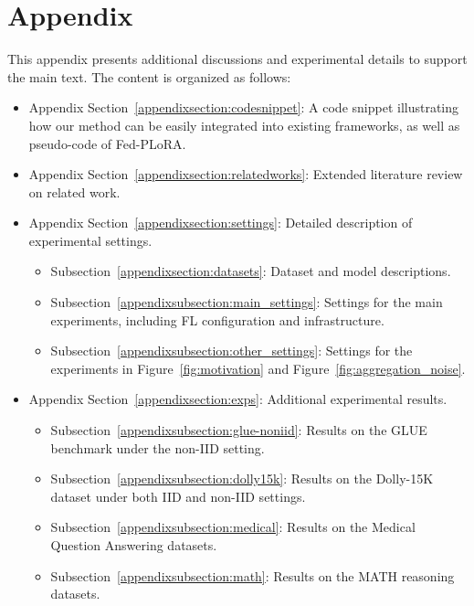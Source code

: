\documentclass{article} %
\begin{document}
\newpage

\section*{Appendix}

This appendix presents additional discussions and experimental details to support the main text. The content is organized as follows:

\begin{itemize}
    \item Appendix Section~\ref{appendixsection:codesnippet}: A code snippet illustrating how our method can be easily integrated into existing frameworks{, as well as pseudo-code of Fed-PLoRA.
    }


    \item Appendix Section~\ref{appendixsection:relatedworks}: Extended literature review on related work.

    \item Appendix Section~\ref{appendixsection:settings}: Detailed description of experimental settings.
        \begin{itemize}
            \item Subsection~\ref{appendixsection:datasets}: Dataset and model descriptions.
            \item Subsection~\ref{appendixsubsection:main_settings}: Settings for the main experiments, including FL configuration and infrastructure.
            \item Subsection~\ref{appendixsubsection:other_settings}: Settings for the experiments in Figure~\ref{fig:motivation} and Figure~\ref{fig:aggregation_noise}.
        \end{itemize}

    \item Appendix Section~\ref{appendixsection:exps}: Additional experimental results.
        \begin{itemize}
            \item Subsection~\ref{appendixsubsection:glue-noniid}: Results on the GLUE benchmark under the non-IID setting.
            \item Subsection~\ref{appendixsubsection:dolly15k}: Results on the Dolly-15K dataset under both IID and non-IID settings.
            \item Subsection~\ref{appendixsubsection:medical}: Results on the Medical Question Answering datasets.
            \item {Subsection~\ref{appendixsubsection:math}: Results on the MATH reasoning datasets.}



\end{itemize}
\end{itemize}
\end{document}
